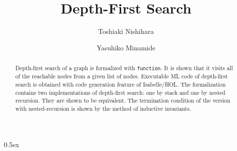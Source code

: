 \documentclass[11pt,a4paper]{article}
\begin{document}
\title{Depth-First Search}
\author{Toshiaki Nishihara \and Yasuhiko Minamide}
\maketitle

\begin{abstract}
  Depth-first search of a graph is formalized with \texttt{function}. 
  It is shown that it visits all of the reachable nodes from a given list of 
  nodes. Executable ML code of depth-first search is obtained with code 
  generation feature of Isabelle/HOL.
  The formalization contains two implementations of depth-first search: 
  one by stack and one by nested recursion. They are shown to be equivalent. 
  The termination condition of the version with nested-recursion is shown 
  by the method of inductive invariants.
\end{abstract}

\tableofcontents

\parindent 0pt\parskip 0.5ex


\end{document}
